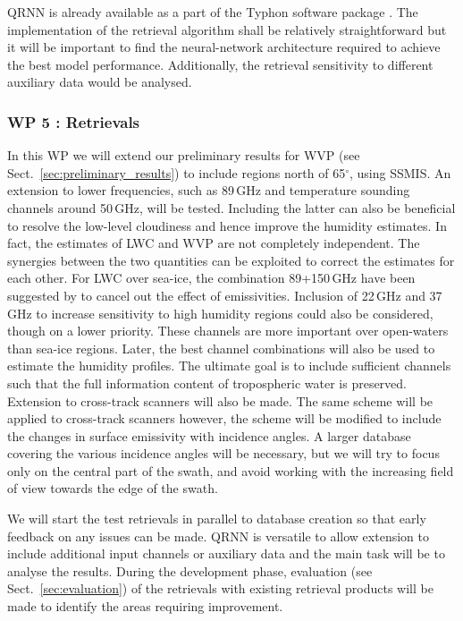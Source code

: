 \documentclass[12pt,oneside,a4paper]{article}
\begin{document}
QRNN is already available as a part of the Typhon software package
\citep{lemke:2020:typhon}. The implementation of the retrieval algorithm shall
be relatively straightforward but it will be important to find the
neural-network architecture required to achieve the best model performance.
Additionally, the retrieval sensitivity to different auxiliary data would be
analysed.


\vspace{-1.0ex}
\subsubsection*{WP 5 : Retrievals}
%
\label{sec:retrievals}
%
In this WP we will extend our preliminary results for WVP (see
Sect.~\ref{sec:preliminary_results}) to include regions north of 65$^\circ$,
using SSMIS. An extension to lower frequencies, such as 89\,GHz and temperature
sounding channels around 50\,GHz, will be tested. Including the latter can also
be beneficial to resolve the low-level cloudiness and hence improve the
humidity estimates. In fact, the estimates of LWC and WVP are not completely
independent. The synergies between the two quantities can be exploited to
correct the estimates for each other. For LWC over sea-ice, the combination
89+150\,GHz have been suggested by \citet{laue:2007:poten} to cancel out the
effect of emissivities. Inclusion of 22\,GHz and 37\,GHz to increase
sensitivity to high humidity regions could also be considered, though on a
lower priority. These channels are more important over open-waters than sea-ice
regions. Later, the best channel combinations will also be used to estimate the
humidity profiles. The ultimate goal is to include sufficient channels such
that the full information content of tropospheric water is preserved. Extension
to cross-track scanners will also be made. The same scheme will be applied to
cross-track scanners however, the scheme will be modified to include the
changes in surface emissivity with incidence angles. A larger database covering
the various incidence angles will be necessary, but we will try to focus only
on the central part of the swath, and avoid working with the increasing field
of view towards the edge of the swath.

We will start the test retrievals in parallel to database creation so that
early feedback on any issues can be made. QRNN is versatile to allow extension
to include additional input channels or auxiliary data and the main task will
be to analyse the results. During the development phase, evaluation (see
Sect.~\ref{sec:evaluation}) of the retrievals with existing retrieval products
will be made to identify the areas requiring improvement.
\end{document}

